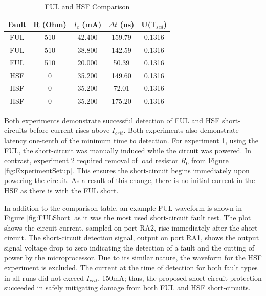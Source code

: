 \documentclass[11pt,oneside]{report}
\begin{document}
    \begin{table}
        \centering
        \bgroup
        \def\arraystretch{1.25}%
        \begin{tabular}{| c | c | c | c | c |}
              \hline			
              Fault & R (Ohm) & $I_{c}$ (mA) & $\Delta t$ (us) & U($\mathrm{T}_{scd}$)\\ \hline \hline \cline{1-5}
            FUL & 510 & 42.400 & 159.79 & 0.1316\\ \hline
            FUL & 510 & 38.800 & 142.59 & 0.1316\\	\hline
            FUL & 510 & 20.000 &  50.39 & 0.1316\\	\hline
            HSF &   0 & 35.200 & 149.60 & 0.1316\\	\hline
            HSF &   0 & 35.200 &  72.01 & 0.1316\\	\hline
            HSF &   0 & 35.200 & 175.20 & 0.1316\\	\hline
          \end{tabular}
        \egroup
        \caption{FUL and HSF Comparison}
        \label{tab:FULHSFComparison}
    \end{table}
    
    Both experiments demonstrate successful detection of FUL and HSF short-circuits before current rises above $I_{crit}$. Both experiments also demonstrate latency one-tenth of the minimum time to detection. For experiment 1, using the FUL, the short-circuit was manually induced while the circuit was powered. In contrast, experiment 2 required removal of load resistor $R_{0}$ from Figure \ref{fig:ExperimentSetup}. This ensures the short-circuit begins immediately upon powering the circuit. As a result of this change, there is no initial current in the HSF as there is with the FUL short.
    
    In addition to the comparison table, an example FUL waveform is shown in Figure \ref{fig:FULShort} as it was the most used short-circuit fault test. The plot shows the circuit current, sampled on port RA2, rise immediately after the short-circuit. The short-circuit detection signal, output on port RA1, shows the output signal voltage drop to zero indicating the detection of a fault and the cutting of power by the microprocessor. Due to its similar nature, the waveform for the HSF experiment is excluded. The current at the time of detection for both fault types in all runs did not exceed $I_{crit}$, 150mA; thus, the proposed short-circuit protection succeeded in safely mitigating damage from both FUL and HSF short-circuits.
    
\end{document}
